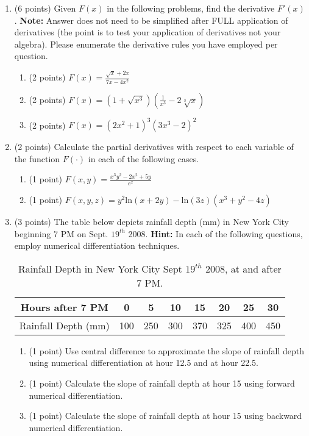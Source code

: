 \documentclass{article}%
\begin{document}
\begin{enumerate}
\item (6 points) Given $F(x)$ in the following problems, find the derivative $F'(x)$. \textbf{Note:} Answer does not need to be simplified after FULL application of derivatives (the point is to test your application of derivatives not your algebra). Please enumerate the derivative rules you have employed per question.
\begin{enumerate}
    \item (2 points) $F(x) =\frac{\sqrt{x}+2x}{7x-4x^2}$\\
    \item (2 points) $F(x) = (1 + \sqrt{x^3})(\frac{1}{x^3} - 2\sqrt[3]{x})$\\
    \item (2 points) $F(x) = (2x^2+1)^3(3x^3-2)^2$\\
\end{enumerate}
\item (2 points) Calculate the partial derivatives with respect to each variable of the function $F(\cdot)$ in each of the following cases.
\begin{enumerate}
    \item (1 point) $F(x,y) = \frac{x^3y^2 - 2x^2 + 5y}{e^x}$\\
    \item (1 point) $F(x,y,z) = y^2\mathrm{ln}(x+2y) -  \mathrm{ln}(3z)(x^3 + y^2 -4z)$
\end{enumerate}


\item (3 points) The table below depicts rainfall depth (mm) in New York City beginning 7 PM on Sept. $19^{th}$ 2008. \textbf{Hint:} In each of the following questions, employ numerical differentiation techniques.
\vspace{5ex}
\begin{table}[!ht]
    \centering
    \begin{tabular}{c|c|c|c|c|c|c|c}
         \midrule 
         Hours after 7 PM&0&5&10&15&20&25&30\\\hline
         \vspace{0.5ex}Rainfall Depth (mm)&100&250&300&370&325&400&450\\\bottomrule
    \end{tabular}
    \caption{Rainfall Depth in New York City Sept $19^{th}$ 2008, at and after 7 PM.}
    \label{tab:rainfall_table}
\end{table}
\begin{enumerate}
    \item (1 point) Use central difference to approximate the slope of rainfall depth using numerical differentiation at hour 12.5 and at hour 22.5.
    \item (1 point) Calculate the slope of rainfall depth at hour 15 using forward numerical differentiation.
    \item (1 point) Calculate the slope of rainfall depth at hour 15 using backward numerical differentiation.
    \end{enumerate}
\end{enumerate}
\end{document}
